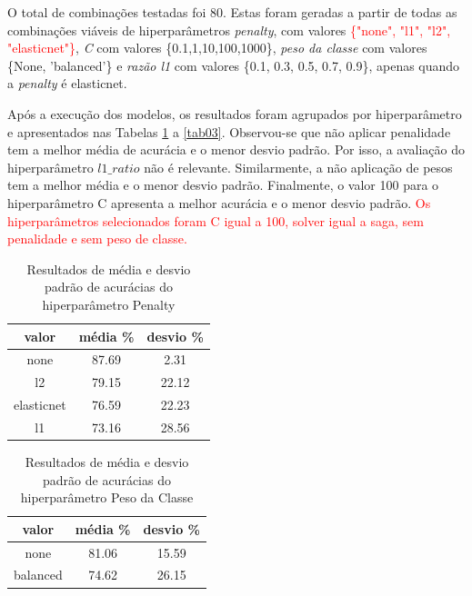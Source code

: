 O total de combinações testadas foi 80. Estas foram geradas a partir de todas as combinações viáveis de hiperparâmetros \textit{penalty}, com valores \textcolor{red}{\{"none", "l1", "l2", "elasticnet"\}}, \textit{C} com valores \{0.1,1,10,100,1000\}, \textit{peso da classe} com valores \{None, 'balanced'\} e \textit{razão l1} com valores \{0.1, 0.3, 0.5, 0.7, 0.9\}, apenas quando a \textit{penalty} é elasticnet.

Após a execução dos modelos, os resultados foram agrupados por hiperparâmetro e apresentados nas Tabelas \ref{tab01} a \ref{tab03}. Observou-se que não aplicar penalidade tem a melhor média de acurácia e o menor desvio padrão. Por isso, a avaliação do hiperparâmetro $l1\_ratio$ não é relevante. Similarmente, a não aplicação de pesos tem a melhor média e o menor desvio padrão. Finalmente, o valor 100 para o hiperparâmetro C apresenta a melhor acurácia e o menor desvio padrão.
\textcolor{red}{
Os hiperparâmetros selecionados foram C igual a 100, solver igual a saga, sem penalidade e sem peso de classe.}

\begin{table}[!htpp]
	\vspace{0.3cm}
  \caption{Resultados de média e desvio padrão de acurácias do hiperparâmetro Penalty}
	\vspace{-0.6cm}
	\label{tab01}
	\renewcommand{\arraystretch}{1.2}
	\begin{center}
\begin{tabular}{ccc}
\hline
\textbf{valor} &	\textbf{média \%}	& \textbf{desvio \%}\\
\hline		
      none & 87.69 & 2.31 \\
        l2 & 79.15 & 22.12 \\
elasticnet & 76.59 & 22.23 \\
        l1 & 73.16 & 28.56
 \\
\hline
\end{tabular}
\end{center}
\end{table}

\begin{table}[!htpp]
	\vspace{0.3cm}
  \caption{Resultados de média e desvio padrão de acurácias do hiperparâmetro Peso da Classe}
	\vspace{-0.6cm}
	\label{tab02}
	\renewcommand{\arraystretch}{1.2}
	\begin{center}
\begin{tabular}{ccc}
\hline
\textbf{valor} &	\textbf{média \%}	& \textbf{desvio \%}\\
\hline		
        none & 81.06 & 15.59 \\
    balanced & 74.62 & 26.15 \\
\hline
\end{tabular}
\end{center}
\end{table}

